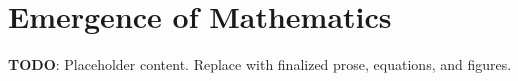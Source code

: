 
\section{Emergence of Mathematics}
\label{sec:emergence-of-mathematics}

\textbf{TODO}: Placeholder content. Replace with finalized prose, equations, and figures.

